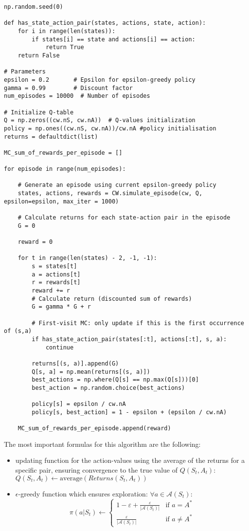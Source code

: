 \documentclass[11pt,a4paper]{article}
\begin{document}
\begin{lstlisting}
np.random.seed(0)

def has_state_action_pair(states, actions, state, action):
    for i in range(len(states)):
        if states[i] == state and actions[i] == action:
            return True
    return False

# Parameters
epsilon = 0.2       # Epsilon for epsilon-greedy policy
gamma = 0.99        # Discount factor
num_episodes = 10000  # Number of episodes

# Initialize Q-table
Q = np.zeros((cw.nS, cw.nA))  # Q-values initialization
policy = np.ones((cw.nS, cw.nA))/cw.nA #policy initialisation
returns = defaultdict(list)

MC_sum_of_rewards_per_episode = []

for episode in range(num_episodes):

    # Generate an episode using current epsilon-greedy policy
    states, actions, rewards = CW.simulate_episode(cw, Q, epsilon=epsilon, max_iter = 1000)
    
    # Calculate returns for each state-action pair in the episode
    G = 0

    reward = 0
    
    for t in range(len(states) - 2, -1, -1):
        s = states[t]
        a = actions[t]
        r = rewards[t]
        reward += r
        # Calculate return (discounted sum of rewards)
        G = gamma * G + r
        
        # First-visit MC: only update if this is the first occurrence of (s,a)
        if has_state_action_pair(states[:t], actions[:t], s, a):
            continue

        returns[(s, a)].append(G)
        Q[s, a] = np.mean(returns[(s, a)])
        best_actions = np.where(Q[s] == np.max(Q[s]))[0]
        best_action = np.random.choice(best_actions)
             
        policy[s] = epsilon / cw.nA
        policy[s, best_action] = 1 - epsilon + (epsilon / cw.nA)

    MC_sum_of_rewards_per_episode.append(reward)
\end{lstlisting}

\pagebreak

The most important formulas for this algorithm are the following: 
\begin{itemize}
    \item updating function for the action-values using the average of the returns for a specific pair, ensuring convergence to the true value of $Q(S_t, A_t)$: $Q(S_t, A_t) \leftarrow \text{average}(Returns(S_t, A_t))$
    \item $\epsilon$-greedy function which ensures exploration: \(\forall a \in \mathcal{A}(S_t) \):
        \[
        \pi(a|S_t) \leftarrow 
        \begin{cases} 
        1 - \varepsilon + \frac{\varepsilon}{|\mathcal{A}(S_t)|} & \text{if } a = A^* \\ 
        \frac{\varepsilon}{|\mathcal{A}(S_t)|} & \text{if } a \neq A^*
        \end{cases}
        \]
\end{itemize}
\vline
\end{document}
